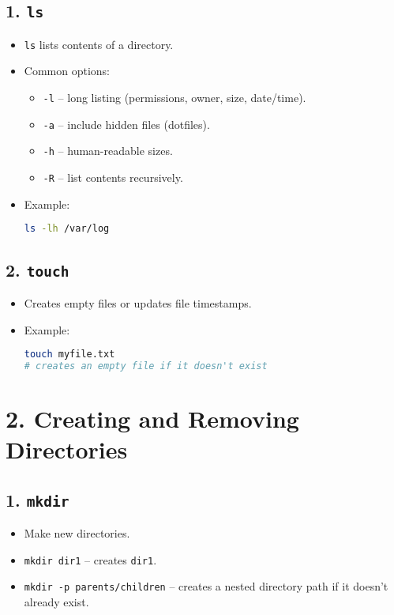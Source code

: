 \documentclass[a4paper]{report}
\begin{document}
\subsection*{1. \texttt{ls}}
\begin{itemize}
    \item \texttt{ls} lists contents of a directory.
    \item Common options:
    \begin{itemize}
        \item \texttt{-l} -- long listing (permissions, owner, size, date/time).
        \item \texttt{-a} -- include hidden files (dotfiles).
        \item \texttt{-h} -- human-readable sizes.
        \item \texttt{-R} -- list contents recursively.
    \end{itemize}
    \item Example:
\begin{lstlisting}[language=bash]
ls -lh /var/log
\end{lstlisting}
\end{itemize}

\subsection*{2. \texttt{touch}}
\begin{itemize}
    \item Creates empty files or updates file timestamps.
    \item Example:
\begin{lstlisting}[language=bash]
touch myfile.txt
# creates an empty file if it doesn't exist
\end{lstlisting}
\end{itemize}

\section*{2. Creating and Removing Directories}
\subsection*{1. \texttt{mkdir}}
\begin{itemize}
    \item Make new directories.
    \item \texttt{mkdir dir1} -- creates \texttt{dir1}.
    \item \texttt{mkdir -p parents/children} -- creates a nested directory path if it doesn’t already exist.
\end{itemize}
\end{document}
